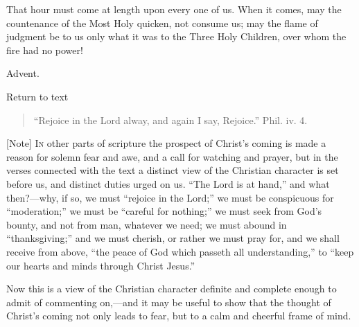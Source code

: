 That hour must come at length upon every one of us. When it comes,
may the countenance of the Most Holy quicken, not consume us; may the
flame of judgment be to us only what it was to the Three Holy
Children, over whom the fire had no power!


Advent.

Return to text


\begin{quote}

``Rejoice in the Lord alway, and again I say, Rejoice.''
Phil. iv. 4.

\end{quote}

[Note] I\textsc{n} other parts of
scripture the prospect of Christ's coming is made a reason for solemn
fear and awe, and a call for watching and prayer, but in the verses
connected with the text a distinct view of the Christian character is
set before us, and distinct duties urged on us. ``The Lord is at
hand,'' and what then?—why, if so, we must ``rejoice in the
Lord;'' we must be conspicuous for ``moderation;'' we
must be ``careful for nothing;'' we must seek from God's
bounty, and not from man, whatever we need; we must abound in
``thanksgiving;'' and we must cherish, or rather we must pray
for, and we shall receive from above, ``the peace of God which
passeth all understanding,'' to ``keep our hearts and minds
through Christ Jesus.''

Now this is a view of the Christian character definite and complete
enough to admit of commenting on,—and it may be useful to show that
the thought of Christ's coming not only leads to fear, but to a calm
and cheerful frame of mind.

